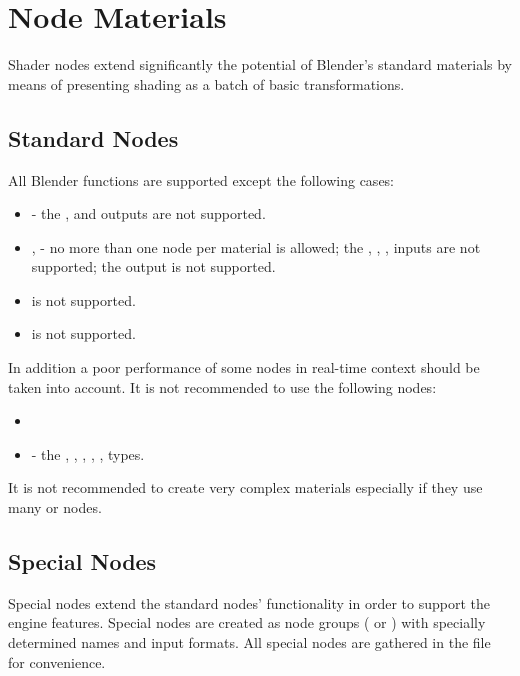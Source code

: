 \documentclass[a4paper,12pt,oneside]{sphinxmanual}
\begin{document}
\chapter{Node Materials}
\label{node_materials:index-0}\label{node_materials::doc}\label{node_materials:id1}
Shader nodes extend significantly the potential of Blender's standard materials by means of presenting shading as a batch of basic transformations.


\section{Standard Nodes}
\label{node_materials:id2}\label{node_materials:index-1}\label{node_materials:generic-node-materials}
All Blender functions are supported except the following cases:
\begin{itemize}
\item {} 
 - the ,  and  outputs are not supported.

\item {} 
,  - no more than one node per material is allowed; the , , ,  inputs are not supported; the  output is not supported.

\item {} 
 is not supported.

\item {} 
 is not supported.

\end{itemize}

In addition a poor performance of some nodes in real-time context should be taken into account. It is not recommended to use the following nodes:
\begin{itemize}
\item {} 

\item {} 
 - the , , , , ,  types.

\end{itemize}

It is not recommended to create very complex materials especially if they use many  or  nodes.


\section{Special Nodes}
\label{node_materials:custom-node-materials}\label{node_materials:id3}
Special nodes extend the standard nodes' functionality in order to support the engine features. Special nodes are created as node groups ( or ) with specially determined names and input formats. All special nodes are gathered in the  file for convenience.
\end{document}
